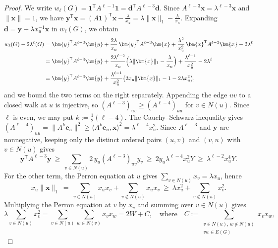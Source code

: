 \documentclass[11pt, a4paper]{article}
\theoremstyle{definition}
\theoremstyle{plain}
\renewcommand{\ge}{\geqslant}
\newcommand{\one}{\mathbf{1}}
\begin{document}
\begin{proof}
We write
$w_\ell (G) =\one^{\mathsf T}A^{\ell -1}\one
=\bm{d}^{\mathsf T}A^{\ell -3}\bm{d}$. 
Since $A^{\ell -3}\bm{x}=\lambda^{\ell -3}\bm{x}$ and 
$\lVert \bm{x}\rVert =1$, we have 
$ \bm{y}^{\mathsf T}\bm{x} 
  =(A\bm{1})^{\mathsf T}\bm{x} -\frac{\lambda}{x_u}
  =\lambda \lVert \bm{x}\rVert_1-\frac{\lambda}{x_u}$. 
Expanding $\bm{d}=\bm{y}+\lambda x_u^{-1}\bm{x}$ in $w_{\ell} (G)$, we
obtain
\begin{align}
  w_\ell (G) - 2 \lambda^{\ell} (G) 
  &=\bm{y}^{\mathsf T}A^{\ell -3}\bm{y}
    +\frac{2\lambda}{x_u}\,
     \bm{y}^{\mathsf T}A^{\ell -3}\bm{x}
    +\frac{\lambda^{2}}{x_u^{2}}\,
     \bm{x}^{\mathsf T}A^{\ell -3}\bm{x}
    -2\lambda^{\ell}  \notag \\[1pt]
  &=\bm{y}^{\mathsf T}A^{\ell -3}\bm{y}
    +\frac{2\lambda^{\ell -2}}{x_u}\Big( \lambda \lVert \bm{x}\rVert_1-\frac{\lambda}{x_u} \Big)
    +\frac{\lambda^{\ell -1}}{x_u^{2}}
    -2\lambda^{\ell}  \notag \\[1pt]
  &=\bm{y}^{\mathsf T}A^{\ell -3}\bm{y}
    +\frac{\lambda^{\ell -1}}{x_u^{2}}
     \bigl(2x_u\lVert \bm{x}\rVert_1-1
     -2\lambda x_u^{2}\bigr), \label{eq-difference}
\end{align}
and we bound the two terms on the right separately.
Appending the edge $uv$ to a closed walk at $u$ is
injective, so 
$(A^{\ell -3})_{uv}\ge (A^{\ell -4})_{uu}$ for $v\in N(u)$. 
Since $\ell$ is even, we may put $k:= \frac{1}{2}(\ell -4)$. The Cauchy--Schwarz inequality gives $(A^{\ell -4})_{uu}
=\lVert A^{k}\bm{e}_u\rVert^{2}
\ge \langle A^{k}\bm{e}_u,\bm{x}\rangle^{2}
=\lambda^{\ell -4}x_u^{2}$. Since
$A^{\ell -3}$ and $\bm{y}$ are nonnegative, keeping only
the distinct ordered pairs $(u,v)$ and $(v,u)$ with
$v\in N(u)$ gives
\[
  \bm{y}^{\mathsf T}A^{\ell -3}\bm{y} \ \ge \ 
  \sum_{v\in N(u)} 2\, y_u (A^{\ell -3})_{uv} y_v 
  \ \ge\ 2y_u\lambda^{\ell -4}x_u^{2}Y
  \ \ge\ \lambda^{\ell -2}x_u^{4}Y .
\]
For the other term, the Perron equation at $u$ gives
$\sum_{v\in N(u)}x_v = \lambda x_u$, hence
\begin{equation} \label{eq-xu-1-norm}
x_u\lVert \bm{x}\rVert_1 \ = \ \sum_{v\in N(u)} x_u x_v 
+ \sum_{v\notin N(u)} x_ux_v 
\ \ge \  \lambda x_u^{2}
+\sum_{v\notin N(u)}x_v^{2}.
\end{equation}
Multiplying the Perron equation at $v$ by $x_v$ and
summing over $v\in N(u)$ gives
$$\lambda \sum_{v\in N(u)} x_v^2= \sum_{v\in N(u)} \sum_{w\in N(v)} x_vx_w =  2W + C, 
\quad \text{where}\quad  C:=\sum_{\substack{v\in N(u),\,w\notin N(u) \\ vw\in E(G)}} x_vx_w, $$ 

\end{proof}
\end{document}
